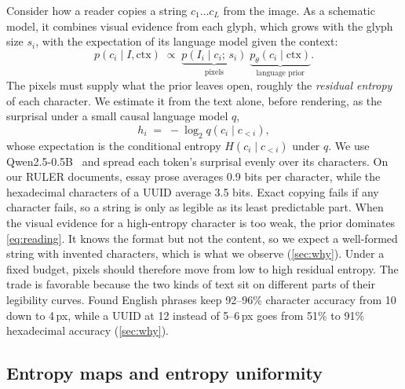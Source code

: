 Consider how a reader copies a string $c_1\dots c_L$ from the image.
As a schematic model, it combines visual evidence from each glyph, which grows with the glyph size $s_i$, with the expectation of its language model given the context:
\begin{equation}
  p(c_i \mid I, \mathrm{ctx}) \;\propto\; \underbrace{p(I_i \mid c_i;\, s_i)}_{\text{pixels}} \; \underbrace{p_\theta(c_i \mid \mathrm{ctx})}_{\text{language prior}} .
  \label{eq:reading}
\end{equation}
The pixels must supply what the prior leaves open, roughly the \emph{residual entropy} of each character.
We estimate it from the text alone, before rendering, as the surprisal under a small causal language model $q$,
\begin{equation}
  h_i \;=\; -\log_2 q(c_i \mid c_{<i}) ,
  \label{eq:resid}
\end{equation}
whose expectation is the conditional entropy $H(c_i\mid c_{<i})$ under $q$.
We use Qwen2.5-0.5B~\cite{yang2024qwen25} and spread each token's surprisal evenly over its characters.
On our RULER documents, essay prose averages 0.9 bits per character, while the hexadecimal characters of a UUID average 3.5 bits.
Exact copying fails if any character fails, so a string is only as legible as its least predictable part.
When the visual evidence for a high-entropy character is too weak, the prior dominates \cref{eq:reading}. It knows the format but not the content, so we expect a well-formed string with invented characters, which is what we observe (\cref{sec:why}).
Under a fixed budget, pixels should therefore move from low to high residual entropy.
The trade is favorable because the two kinds of text sit on different parts of their legibility curves.
Found English phrases keep 92--96\% character accuracy from 10 down to 4\,px, while a UUID at 12 instead of 5--6\,px goes from 51\% to 91\% hexadecimal accuracy (\cref{sec:why}).

\subsection{Entropy maps and entropy uniformity}
\label{sec:map}

